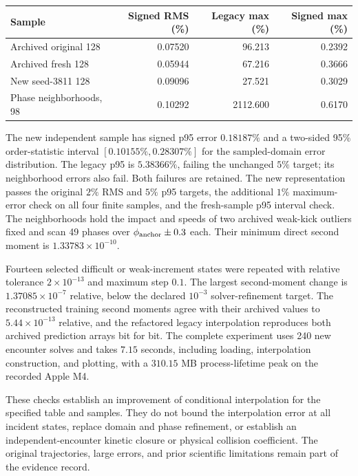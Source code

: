 \documentclass[11pt,letterpaper]{article}
\begin{document}
\begin{center}
\begin{tabular}{lrrr}
\hline
Sample & Signed RMS (\%) & Legacy max (\%) & Signed max (\%)\\
\hline
Archived original 128 & 0.07520 & 96.213 & 0.2392\\
Archived fresh 128    & 0.05944 & 67.216 & 0.3666\\
New seed-3811 128     & 0.09096 & 27.521 & 0.3029\\
Phase neighborhoods, 98 & 0.10292 & 2112.600 & 0.6170\\
\hline
\end{tabular}
\end{center}
The new independent sample has signed p95 error $0.18187\%$ and a two-sided
95\% order-statistic interval $[0.10155\%,0.28307\%]$ for the sampled-domain
error distribution.  The legacy p95 is $5.38366\%$, failing the unchanged
$5\%$ target; its neighborhood errors also fail.  Both failures are retained.
The new representation passes the original $2\%$ RMS and $5\%$ p95 targets,
the additional $1\%$ maximum-error check on all four finite samples, and the
fresh-sample p95 interval check.  The neighborhoods hold the impact and speeds
of two archived weak-kick outliers fixed and scan 49 phases over
$\phi_{\rm anchor}\pm0.3$ each.  Their minimum direct second moment is
$1.33783\times10^{-10}$.

Fourteen selected difficult or weak-increment states were repeated with
relative tolerance $2\times10^{-13}$ and maximum step $0.1$.  The largest
second-moment change is $1.37085\times10^{-7}$ relative, below the declared
$10^{-3}$ solver-refinement target.  The reconstructed training second moments
agree with their archived values to $5.44\times10^{-13}$ relative, and the
refactored legacy interpolation reproduces both archived prediction arrays
bit for bit.  The complete experiment uses 240 new encounter solves and takes
$7.15$ seconds, including loading, interpolation construction, and plotting,
with a $310.15$ MB process-lifetime peak on the recorded Apple M4.

These checks establish an improvement of conditional interpolation for the
specified table and samples.  They do not bound the interpolation error at
all incident states, replace domain and phase refinement, or establish an
independent-encounter kinetic closure or physical collision coefficient.
The original trajectories, large errors, and prior scientific limitations
remain part of the evidence record.
\end{document}
